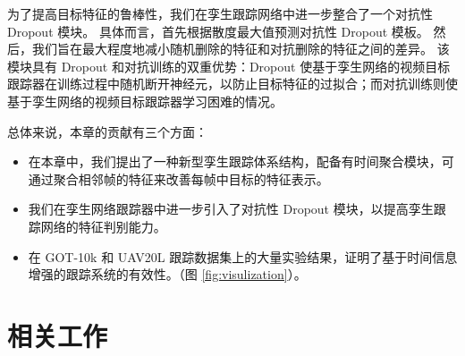 为了提高目标特征的鲁棒性，我们在孪生跟踪网络中进一步整合了一个对抗性 Dropout \cite{park2018adversarial} 模块。
具体而言，首先根据散度最大值预测对抗性 Dropout 模板。
然后，我们旨在最大程度地减小随机删除的特征和对抗删除的特征之间的差异。
该模块具有 Dropout 和对抗训练的双重优势：Dropout 使基于孪生网络的视频目标跟踪器在训练过程中随机断开神经元，以防止目标特征的过拟合；而对抗训练则使基于孪生网络的视频目标跟踪器学习困难的情况。

总体来说，本章的贡献有三个方面：
\begin{itemize}
\item 在本章中，我们提出了一种新型孪生跟踪体系结构，配备有时间聚合模块，可通过聚合相邻帧的特征来改善每帧中目标的特征表示。
\item 我们在孪生网络跟踪器中进一步引入了对抗性 Dropout 模块，以提高孪生跟踪网络的特征判别能力。
\item 在 GOT-10k \cite{GOT-10k} 和 UAV20L \cite{mueller2016benchmark} 跟踪数据集上的大量实验结果，证明了基于时间信息增强的跟踪系统的有效性。（图 \ref{fig:visulization}）。
\end{itemize}

\section{相关工作}

